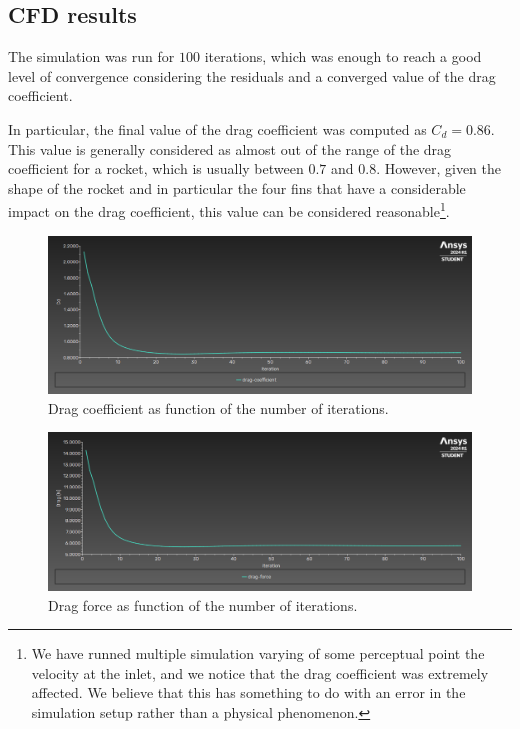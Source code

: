 \subsection{CFD results}
\label{subsec:cfd_results}

The simulation was run for $100$ iterations, which was enough to reach a good level of convergence considering the residuals and a converged value of the drag coefficient.

In particular, the final value of the drag coefficient was computed as $C_d = 0.86$.
This value is generally considered as almost out of the range of the drag coefficient for a rocket, which is usually between $0.7$ and $0.8$.
However, given the shape of the rocket and in particular the four fins that have a considerable impact on the drag coefficient, this value can be considered reasonable\footnote{We have runned multiple simulation varying of some perceptual point the velocity at the inlet, and we notice that the drag coefficient was extremely affected. We believe that this has something to do with an error in the simulation setup rather than a physical phenomenon.}.

\begin{figure}[H]
    \centering
    \includegraphics[width=.8\textwidth]{img/Results/Drag_coefficient_plot.png}
    \caption{Drag coefficient as function of the number of iterations.}
    \label{fig:drag_coefficient}
\end{figure}

\begin{figure}[H]
    \centering
    \includegraphics[width=.8\textwidth]{img/Results/Drag_force.png}
    \caption{Drag force as function of the number of iterations.}
    \label{fig:drag_force}
\end{figure}

